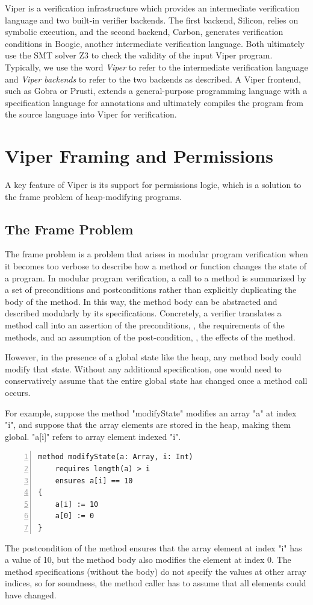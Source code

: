 \documentclass[msc,oneside]{ubcthesis}
\theoremstyle{definition}
\begin{document}
Viper \cite{viper} is a verification infrastructure which provides an intermediate verification language and two built-in verifier backends. The first backend, Silicon, relies on symbolic execution, and the second backend, Carbon, generates verification conditions in Boogie, another intermediate verification language. Both ultimately use the SMT solver Z3 to check the validity of the input Viper program. Typically, we use the word \emph{Viper} to refer to the intermediate verification language and \emph{Viper backends} to refer to the two backends as described. A Viper frontend, such as Gobra or Prusti, extends a general-purpose programming language with a specification language for annotations and ultimately compiles the program from the source language into Viper for verification. 

\section{Viper Framing and Permissions}
A key feature of Viper is its support for permissions logic, which is a solution to the frame problem of heap-modifying programs.

\subsection{The Frame Problem}
The frame problem is a problem that arises in modular program verification when it becomes too verbose to describe how a method or function changes the state of a program. In modular program verification, a call to a method is summarized by a set of preconditions and postconditions rather than explicitly duplicating the body of the method. In this way, the method body can be abstracted and described modularly by its specifications.  Concretely, a verifier translates a method call into an assertion of the preconditions, \ie, the requirements of the methods, and an assumption of the post-condition, \ie, the effects of the method. 

However, in the presence of a global state like the heap, any method body could modify that state. Without any additional specification, one would need to conservatively assume that the entire global state has changed once a method call occurs. 

For example, suppose the method "modifyState" modifies an array "a" at index "i", and suppose that the array elements are stored in the heap, making them global. "a[i]" refers to array element indexed "i".
\begin{lstlisting}[language=silver,numbers=left, firstnumber=1, stepnumber=1]
method modifyState(a: Array, i: Int)
    requires length(a) > i
    ensures a[i] == 10
{
    a[i] := 10
    a[0] := 0
}
\end{lstlisting}
The postcondition of the method ensures that the array element at index "i" has a value of 10, but the method body also modifies the element at index 0. The method specifications (without the body) do not specify the values at other array indices, so for soundness, the method caller has to assume that all elements could have changed.
\end{document}

